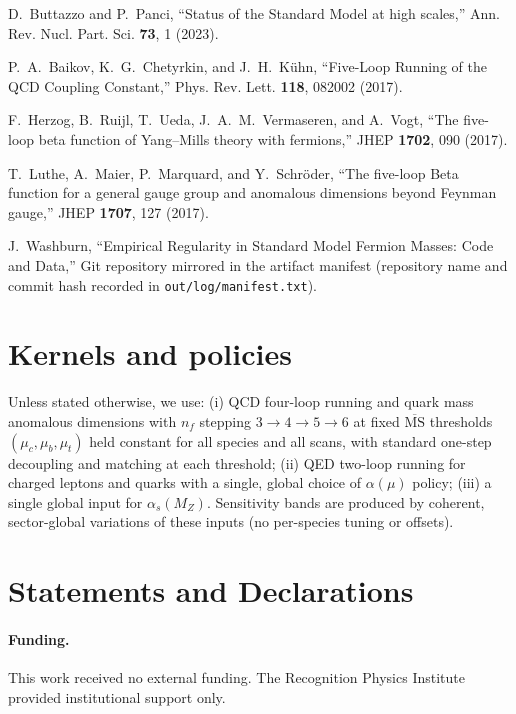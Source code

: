 \documentclass[aps,prd,onecolumn,amsmath,amssymb,superscriptaddress,nofootinbib,showpacs,showkeys]{revtex4-2}
\begin{document}
\begin{thebibliography}{99}
D.~Buttazzo and P.~Panci,
``Status of the Standard Model at high scales,''
Ann. Rev. Nucl. Part. Sci. \textbf{73}, 1 (2023).



P.~A.~Baikov, K.~G.~Chetyrkin, and J.~H.~Kühn,
``Five-Loop Running of the QCD Coupling Constant,''
Phys. Rev. Lett. \textbf{118}, 082002 (2017).

F.~Herzog, B.~Ruijl, T.~Ueda, J.~A.~M.~Vermaseren, and A.~Vogt,
``The five-loop beta function of Yang–Mills theory with fermions,''
JHEP \textbf{1702}, 090 (2017).

T.~Luthe, A.~Maier, P.~Marquard, and Y.~Schröder,
``The five-loop Beta function for a general gauge group and anomalous dimensions beyond Feynman gauge,''
JHEP \textbf{1707}, 127 (2017).




J.~Washburn,
``Empirical Regularity in Standard Model Fermion Masses: Code and Data,''
Git repository mirrored in the artifact manifest (repository name and commit hash recorded in \texttt{out/log/manifest.txt}).




\end{thebibliography}

\section*{Kernels and policies}
Unless stated otherwise, we use:
(i) QCD four-loop running and quark mass anomalous dimensions with
$n_f$ stepping $3\to4\to5\to6$ at fixed $\overline{\mathrm{MS}}$ thresholds $(\mu_c,\mu_b,\mu_t)$ held constant for all species and all scans, with standard one-step decoupling and matching at each threshold;
(ii) QED two-loop running for charged leptons and quarks with a single, global choice of $\alpha(\mu)$ policy;
(iii) a single global input for $\alpha_s(M_Z)$.
Sensitivity bands are produced by coherent, sector-global variations of these inputs (no per-species tuning or offsets).

\section*{Statements and Declarations}

\paragraph{Funding.}
This work received no external funding. The Recognition Physics Institute provided institutional support only.
\end{document}
